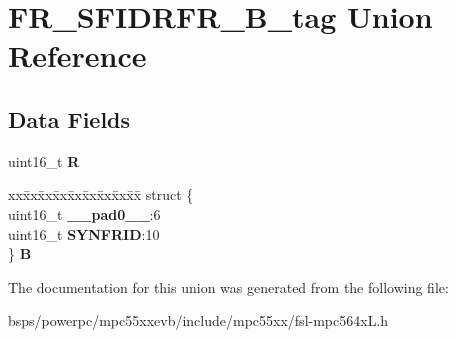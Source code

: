 \hypertarget{unionFR__SFIDRFR__16B__tag}{}\section{F\+R\+\_\+\+S\+F\+I\+D\+R\+F\+R\+\_\+B\+\_\+tag Union Reference}
\label{unionFR__SFIDRFR__16B__tag}
\subsection*{Data Fields}
\begin{DoxyCompactItemize}
\item 
\mbox{\label{unionFR__SFIDRFR__16B__tag_a4377795ac5fbee81ec84073ec86d7bfc}} 
uint16\+\_\+t {\bfseries R}
\item 
\mbox{\label{unionFR__SFIDRFR__16B__tag_a65855ba6801bdcc4f87b55b239130ff9}} 
\begin{tabbing}
xx\=xx\=xx\=xx\=xx\=xx\=xx\=xx\=xx\=\kill
struct \{\\
\>uint16\_t {\bfseries \_\_pad0\_\_}:6\\
\>uint16\_t {\bfseries SYNFRID}:10\\
\} {\bfseries B}\\

\end{tabbing}\end{DoxyCompactItemize}


The documentation for this union was generated from the following file\+:\begin{DoxyCompactItemize}
\item 
bsps/powerpc/mpc55xxevb/include/mpc55xx/fsl-\/mpc564x\+L.\+h\end{DoxyCompactItemize}
